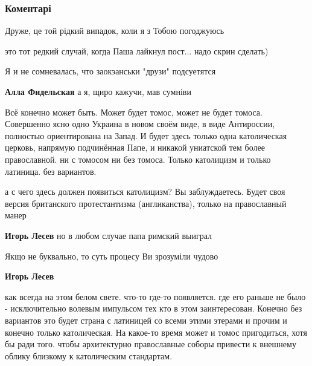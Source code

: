  
 
 
 
 
\subsubsection{Коментарі}
\label{sec:07_09_2018.fb.lesev_igor.1.o_tomose.cmt}

\begin{itemize} %
Друже, це той рідкий випадок, коли я з Тобою погоджуюсь

\begin{itemize} %

это тот редкий случай, когда Паша лайкнул пост... надо скрин сделать)

Я и не сомневалась, что заокэанськи "друзи" подсуетятся

\textbf{Алла Фидельская} а я, щиро кажучи, мав сумніви

\end{itemize} %


Всё конечно может быть. Может будет томос, может не будет томоса. Совершенно
ясно одно Украина в новом своём виде, в виде Антироссии, полностью
ориентирована на Запад. И будет здесь только одна католическая церковь,
напрямую подчинённая Папе, и никакой униатской тем более православной. ни с
томосом ни без томоса. Только католицизм и только латиница. без вариантов.

\begin{itemize} %

а с чего здесь должен появиться католицизм? Вы заблуждаетесь. Будет своя версия
британского протестантизма (англиканства), только на православный манер

\textbf{Игорь Лесев} но в любом случае папа римский выиграл

Якщо не буквально, то суть процесу Ви зрозуміли чудово

\textbf{Игорь Лесев} 

как всегда на этом белом свете. что-то где-то появляется. где его раньше не
было - исключительно волевым импульсом тех кто в этом заинтересован. Конечно
без вариантов это будет страна с латиницей со всеми этими этерами и прочим и
конечно только католическая. На какое-то время может и томос пригодиться, хотя
бы ради того. чтобы архитектурно православные соборы привести к внешнему облику
близкому к католическим стандартам.



\end{itemize}
\end{itemize}
